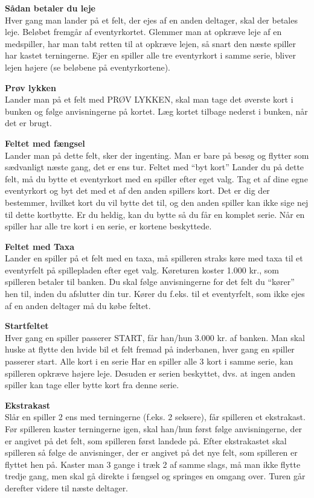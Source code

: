 \textbf{Sådan betaler du leje}
\\Hver gang man lander på et felt, der ejes af en anden deltager, skal der betales leje. Beløbet fremgår af eventyrkortet. Glemmer man at opkræve leje af en medspiller, har man tabt retten til at opkræve lejen, så snart den næste spiller har kastet terningerne. Ejer en spiller alle tre eventyrkort i samme serie, bliver lejen højere (se beløbene på eventyrkortene).

\textbf{Prøv lykken}
\\Lander man på et felt med PRØV LYKKEN, skal man tage det øverste kort i bunken og følge anvisningerne på kortet. 
Læg kortet tilbage nederst i bunken, når det er brugt.

\textbf{Feltet med fængsel}
\\Lander man på dette felt, sker der ingenting. 
Man er bare på besøg og flytter som sædvanligt næste gang, det er ens tur. Feltet med “byt kort”
Lander du på dette felt, må du bytte et eventyrkort med en spiller efter eget valg. 
Tag et af dine egne eventyrkort og byt det med et af den anden spillers kort. 
Det er dig der bestemmer, hvilket kort du vil bytte det til, og den anden spiller kan ikke sige nej til dette kortbytte. 
Er du heldig, kan du bytte så du får en komplet serie. 
Når en spiller har alle tre kort i en serie, er kortene beskyttede.

\textbf{Feltet med Taxa}
\\Lander en spiller på et felt med en taxa, må spilleren straks køre med taxa til et eventyrfelt på spillepladen efter eget valg. 
Køreturen koster 1.000 kr., som spilleren betaler til banken. 
Du skal følge anvisningerne for det felt du “kører” hen til, inden du afslutter din tur. 
Kører du f.eks. til et eventyrfelt, som ikke ejes af en anden deltager må du købe feltet.

\textbf{Startfeltet}
\\Hver gang en spiller passerer START, får han/hun 3.000 kr. af banken. Man skal huske at flytte den hvide bil et felt fremad på inderbanen, hver gang en spiller passerer start. Alle kort i en serie
Har en spiller alle 3 kort i samme serie, kan spilleren opkræve højere leje. Desuden er serien beskyttet, dvs. at ingen anden spiller kan tage eller bytte kort fra denne serie.

\textbf{Ekstrakast}
\\Slår en spiller 2 ens med terningerne (f.eks. 2 seksere), får spilleren et ekstrakast. 
Før spilleren kaster terningerne igen, skal han/hun først følge anvisningerne, der er angivet på det felt, som spilleren først landede på. 
Efter ekstrakastet skal spilleren så følge de anvisninger, der er angivet på det nye felt, som spilleren er flyttet hen på. 
Kaster man 3 gange i træk 2 af samme slags, må man ikke flytte tredje gang, men skal gå direkte i fængsel og springes en omgang over. 
Turen går derefter videre til næste deltager.

